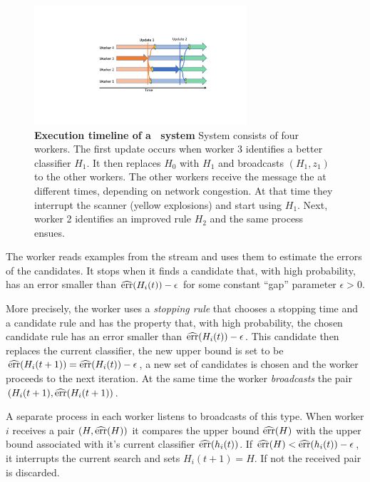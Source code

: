 \begin{figure}[t]
\begin{center}
  \includegraphics[width=0.7\textwidth]{AsyncUpdates.pdf}
\end{center}
  \caption{{\bf Execution timeline of a \tmsn\ system}
      System consists of four workers. The first update occurs when
      worker 3 identifies a better classifier $H_1$. It then replaces
      $H_0$ with $H_1$ and broadcasts $(H_1,z_1)$ to the
    other workers. The other workers receive the message the at different
    times, depending on network congestion. At that time they  interrupt the
    scanner (yellow explosions) and start using $H_1$. Next, worker 2
    identifies an improved rule $H_2$ and the same process ensues.
    \label{fig:async}}
   	\vspace{0pt}
\end{figure}

The worker reads examples from the stream and uses them to estimate
the errors of the candidates. It stops when it finds a candidate that,
with high probability, has an error smaller than
$\widehat{\mbox{err}}(H_i(t))-\epsilon$ for some constant ``gap'' parameter
$\epsilon>0$.

More precisely, the worker uses a {\em stopping rule} that chooses a
stopping time and a candidate rule and has the property that, with
high probability, the chosen candidate rule has an error smaller than
$\widehat{\mbox{err}}(H_i(t))-\epsilon$. This candidate then replaces the current
classifier, the new upper bound is set to be $\widehat{\mbox{err}}(H_i(t+1)) =
\widehat{\mbox{err}}(H_i(t))-\epsilon$, a new set of candidates is chosen and the
worker proceeds to the next iteration. At the same time the worker
{\em broadcasts} the pair $(H_i(t+1), \widehat{\mbox{err}}(H_i(t+1))$.

A separate process in each worker listens to broadcasts of this
type. When worker $i$ receives a pair $(H,\widehat{\mbox{err}}(H))$ it compares the
upper bound $\widehat{\mbox{err}}(H)$ with the upper bound associated with it's
current classifier $\widehat{\mbox{err}}(h_i(t))$. If $\widehat{\mbox{err}}(H) < \widehat{\mbox{err}}(h_i(t))-\epsilon$,
it interrupts the current search and sets $H_i(t+1)=H$. If not the
received pair is discarded.

